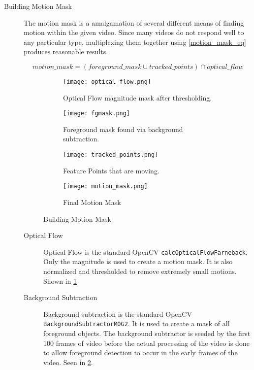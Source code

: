 \documentclass[11pt]{article}
\begin{document}
\begin{description}
\item[Building Motion Mask]

The motion mask is a amalgamation of several different means of finding motion within the given video. Since many videos do not respond well to any particular type, multiplexing them together using \cref{motion_mask_eq} produces reasonable results.

\begin{equation}
\label{motion_mask_eq}
motion\_mask = (foreground\_mask \cup tracked\_points) \cap optical\_flow
\end{equation}

\begin{figure}
\centering
\begin{subfigure}[t]{0.24\textwidth}
\texttt{[image: optical\_flow.png]}
\caption{Optical Flow magnitude mask after thresholding.}
\label{fig:optical_flow}
\end{subfigure}
\begin{subfigure}[t]{0.24\textwidth}
\texttt{[image: fgmask.png]}
\caption{Foreground mask found via background subtraction.}
\label{fig:background}
\end{subfigure}
\begin{subfigure}[t]{0.24\textwidth}
\texttt{[image: tracked\_points.png]}
\caption{Feature Points that are moving.}
\label{fig:tracked_points}
\end{subfigure}
\begin{subfigure}[t]{0.24\textwidth}
\texttt{[image: motion\_mask.png]}
\caption{Final Motion Mask}
\label{fig:motion_mask}
\end{subfigure}
\caption{Building Motion Mask}
\end{figure}

\begin{description}
\item[Optical Flow]

Optical Flow is the standard OpenCV \texttt{calcOpticalFlowFarneback}. Only the magnitude is used to create a motion mask. It is also normalized and thresholded to remove extremely small motions. Shown in \cref{fig:optical_flow}

\item[Background Subtraction]

Background subtraction is the standard OpenCV \texttt{BackgroundSubtractorMOG2}. It is used to create a mask of all foreground objects. The background subtractor is seeded by the first 100 frames of video before the actual processing of the video is done to allow foreground detection to occur in the early frames of the video. Seen in \cref{fig:background}.


\end{description}
\end{description}
\end{document}
